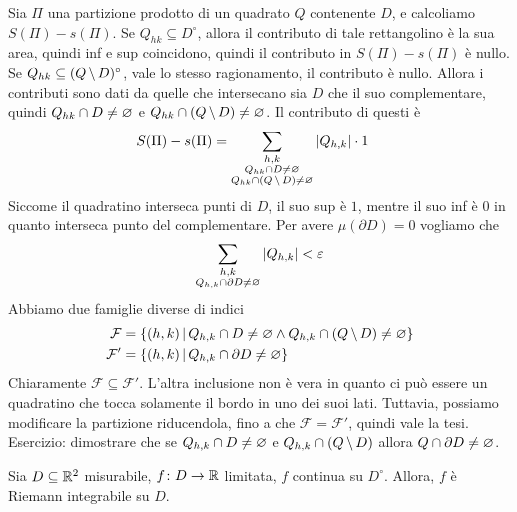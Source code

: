 \documentclass[a4paper]{article}
\begin{document}
\begin{snippetproof}{}
    Sia \(\Pi\) una partizione prodotto di un quadrato \(Q\) contenente \(D\),
    e calcoliamo \(S(\Pi) - s(\Pi)\).
    Se \(Q_{hk} \subseteq D^\circ\), allora il contributo di tale rettangolino è la sua area,
    quindi inf e sup coincidono,
    quindi il contributo in \(S(\Pi)- s(\Pi)\) è nullo.
    Se \(Q_{hk} \subseteq (Q \,\backslash\, D)^\circ\), vale lo stesso ragionamento, il contributo è nullo.
    Allora i contributi sono dati da quelle che intersecano
    sia \(D\) che il suo complementare, quindi \(Q_{hk} \cap D \neq \varnothing\)
    e \(Q_{hk} \cap (Q \,\backslash\, D) \neq \varnothing\).
    Il contributo di questi è
    \begin{align*}
        S(\Pi) - s(\Pi) &= \sum_{\substack{h,k \\ Q_{hk} \cap D \neq \varnothing \\ Q_{hk} \cap (Q \,\backslash\, D) \neq \varnothing}}
        |Q_{h,k}| \cdot 1
    \end{align*}
    Siccome il quadratino interseca punti di \(D\), il suo sup è \(1\), mentre il suo inf è \(0\)
    in quanto interseca punto del complementare.
    Per avere \(\mu(\partial D) = 0\) vogliamo che
    \[
        \sum_{\substack{h,k \\ Q_{h,k} \cap \partial D \neq \varnothing}}
        |Q_{h,k}| < \varepsilon
    \]
    Abbiamo due famiglie diverse di indici
    \begin{align*}
        \mathcal F &= \{(h,k) \,|\, Q_{h,k} \cap D \neq \varnothing \land Q_{h,k} \cap (Q \,\backslash\, D) \neq \varnothing\} \\
        \mathcal F' &= \{(h,k) \,|\, Q_{h,k} \cap \partial D \neq \varnothing\}
    \end{align*}
    Chiaramente \(\mathcal F \subseteq \mathcal F'\).
    L'altra inclusione non è vera in quanto ci può essere un quadratino che tocca solamente il bordo in uno dei suoi lati.
    Tuttavia, possiamo modificare la partizione riducendola, fino a che \(\mathcal F = \mathcal F'\),
    quindi vale la tesi.
    Esercizio:
    dimostrare che se \(Q_{h,k} \cap D \neq \varnothing\) e \(Q_{h,k} \cap (Q \,\backslash\, D)\)
    allora \(Q \cap \partial D \neq \varnothing\).
\end{snippetproof}

\begin{snippettheorem}{}
    Sia \(D \subseteq \mathbb{R}^2\) misurabile, \(f \colon D \to \mathbb{R}\)
    limitata, \(f\) continua su \(D^\circ\).
    Allora, \(f\) è Riemann integrabile su \(D\).
\end{snippettheorem}
\end{document}
